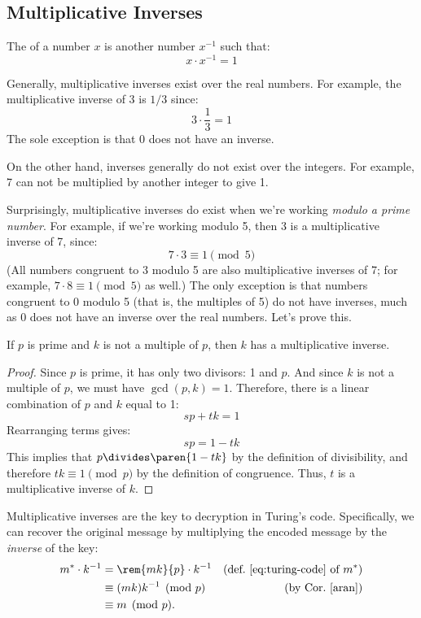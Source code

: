 \subsection{Multiplicative Inverses}
\label{sec:prime}

The  of a number $x$ is another number
$x^{-1}$ such that:
%
\[
x \cdot x^{-1} = 1
\]

Generally, multiplicative inverses exist over the real numbers.  For
example, the multiplicative inverse of 3 is $1 / 3$ since:
%
\[
3 \cdot \frac{1}{3} = 1
\]
%
The sole exception is that 0 does not have an inverse.

On the other hand, inverses generally do not exist over the integers.
For example, 7 can not be multiplied by another integer to give 1.

Surprisingly, multiplicative inverses do exist when we're working
\textit{modulo a prime number}.  For example, if we're working modulo
5, then 3 is a multiplicative inverse of 7, since:
%
\[
7 \cdot 3 \equiv 1 \pmod{5}
\]
%
(All numbers congruent to 3 modulo 5 are also multiplicative inverses
of 7; for example, $7 \cdot 8 \equiv 1 \pmod{5}$ as well.)  The only
exception is that numbers congruent to 0 modulo 5 (that is, the
multiples of 5) do not have inverses, much as 0 does not have an
inverse over the real numbers.  Let's prove this.

\begin{lemma}
\label{lem:inverses}
If $p$ is prime and $k$ is not a multiple of $p$, then $k$ has a
multiplicative inverse.
\end{lemma}

\begin{proof}
Since $p$ is prime, it has only two divisors: 1 and $p$.  And since
$k$ is not a multiple of $p$, we must have $\gcd(p, k) = 1$.
Therefore, there is a linear combination of $p$ and $k$ equal to 1:
%
\[
s p + t k = 1
\]
%
Rearranging terms gives:
%
\[
s p = 1 - t k
\]
%
This implies that $p \divides \paren{1 - tk}$ by the definition of divisibility,
and therefore $tk \equiv 1 \pmod{p}$ by the definition of congruence.
Thus, $t$ is a multiplicative inverse of $k$.
\end{proof}

Multiplicative inverses are the key to decryption in Turing's code.
Specifically, we can recover the original message by multiplying the
encoded message by the \textit{inverse} of the key:
\begin{align*}
m^* \cdot k^{-1}
    & = \rem{mk}{p} \cdot k^{-1}
         & \text{(def.~\eqref{eq:turing-code} of $m^*$)}\\
    & \equiv (mk)k^{-1} \pmod{p} & \text{(by Cor.~\ref{aran})}\\
    & \equiv m \pmod{p}.
\end{align*}

